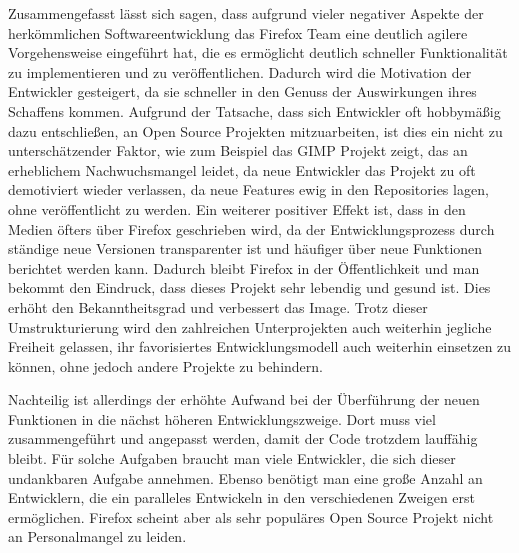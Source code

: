 Zusammengefasst lässt sich sagen, dass aufgrund vieler negativer Aspekte der herkömmlichen Softwareentwicklung das Firefox Team eine deutlich agilere Vorgehensweise eingeführt hat, die es ermöglicht deutlich schneller Funktionalität zu implementieren und zu veröffentlichen. Dadurch wird die Motivation der Entwickler gesteigert, da sie schneller in den Genuss der Auswirkungen ihres Schaffens kommen. Aufgrund der Tatsache, dass sich Entwickler oft hobbymäßig dazu entschließen, an Open Source Projekten mitzuarbeiten, ist dies ein nicht zu unterschätzender Faktor, wie zum Beispiel das GIMP Projekt zeigt, das an erheblichem Nachwuchsmangel leidet, da neue Entwickler das Projekt zu oft demotiviert wieder verlassen,  da neue Features ewig in den Repositories lagen, ohne veröffentlicht zu werden\cite{bib:gimp}. Ein weiterer positiver Effekt ist, dass in den Medien öfters über Firefox geschrieben wird, da der Entwicklungsprozess durch ständige neue Versionen transparenter ist und häufiger über neue Funktionen berichtet werden kann. Dadurch bleibt Firefox in der Öffentlichkeit und man bekommt den Eindruck, dass dieses Projekt sehr lebendig und gesund ist. Dies erhöht den Bekanntheitsgrad und verbessert das Image. Trotz dieser Umstrukturierung wird den zahlreichen Unterprojekten auch weiterhin jegliche Freiheit gelassen, ihr favorisiertes Entwicklungsmodell auch weiterhin einsetzen zu können, ohne jedoch andere Projekte zu behindern.

Nachteilig ist allerdings der erhöhte Aufwand bei der Überführung der neuen Funktionen in die nächst höheren Entwicklungszweige. Dort muss viel zusammengeführt und angepasst werden, damit der Code trotzdem lauffähig bleibt. Für solche Aufgaben braucht man viele Entwickler, die sich dieser undankbaren Aufgabe annehmen. Ebenso benötigt man eine große Anzahl an Entwicklern, die ein paralleles Entwickeln in den verschiedenen Zweigen erst ermöglichen. Firefox scheint aber als sehr populäres Open Source Projekt nicht an Personalmangel zu leiden.

